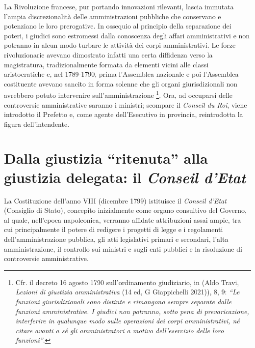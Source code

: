 \documentclass[12pt,it,a4paper,]{report}
\begin{document}
La Rivoluzione francese, pur portando innovazioni rilevanti, lascia
immutata l'ampia discrezionalità delle amministrazioni pubbliche che
conservano e potenziano le loro prerogative. In ossequio al principio
della separazione dei poteri, i giudici sono estromessi dalla conoscenza
degli affari amministrativi e non potranno in alcun modo turbare le
attività dei corpi amministrativi. Le forze rivoluzionarie avevano
dimostrato infatti una certa diffidenza verso la magistratura,
tradizionalmente formata da elementi vicini alle classi aristocratiche
e, nel 1789-1790, prima l'Assemblea nazionale e poi l'Assemblea
costituente avevano sancito in forma solenne che gli organi
giurisdizionali non avrebbero potuto intervenire sull'amministrazione
\footnote{Cfr. il decreto 16 agosto 1790 sull'ordinamento giudiziario,
  in (Aldo Travi, \emph{Lezioni di giustizia amministrativa} (14 ed, {G
  Giappichelli} 2021)), 8, 9: \emph{``Le funzioni giurisdizionali sono
  distinte e rimangono sempre separate dalle funzioni amministrative. I
  giudici non potranno, sotto pena di prevaricazione, interferire in
  qualunque modo sulle operazioni dei corpi amministrativi, né citare
  avanti a sé gli amministratori a motivo dell'esercizio delle loro
  funzioni''}.}. Ora, ad occuparsi delle controversie amministrative
saranno i ministri; scompare il \emph{Conseil du Roi}, viene introdotto
il Prefetto e, come agente dell'Esecutivo in provincia, reintrodotta la
figura dell'intendente.

\hypertarget{dalla-giustizia-ritenuta-alla-giustizia-delegata-il-conseil-detat}{%
\section{\texorpdfstring{Dalla giustizia ``ritenuta'' alla giustizia
delegata: il \emph{Conseil
d'Etat}}{Dalla giustizia ``ritenuta'' alla giustizia delegata: il Conseil d'Etat}}\label{dalla-giustizia-ritenuta-alla-giustizia-delegata-il-conseil-detat}}

La Costituzione dell'anno VIII (dicembre 1799) istituisce il
\emph{Conseil d'Etat} (Consiglio di Stato), concepito inizialmente come
organo consultivo del Governo, al quale, nell'epoca napoleonica,
verranno affidate attribuzioni assai ampie, tra cui principalmente il
potere di redigere i progetti di legge e i regolamenti
dell'amministrazione pubblica, gli atti legislativi primari e secondari,
l'alta amministrazione, il controllo sui ministri e sugli enti pubblici
e la risoluzione di controversie amministrative.
\end{document}
